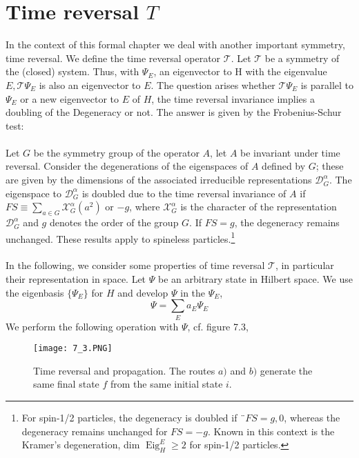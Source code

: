 \section{Time reversal $T$}
In the context of this formal chapter we deal with another important symmetry, time reversal. We define the time reversal operator $\mathcal{T}$. Let $\mathcal{T}$ be a symmetry of the (closed) system. Thus, with $\Psi_E$, an eigenvector to H with the eigenvalue $E, \mathcal{T} \Psi_E$ is also an eigenvector to $E$. The question arises whether $\mathcal{T}\Psi_E$ is parallel to $\Psi_E$ or a new eigenvector to $E$ of $H$, the time reversal invariance implies a doubling of the Degeneracy or not. The answer is given by the Frobenius-Schur test:
\\\\
Let $G$ be the symmetry group of the operator $A$, let $A$ be invariant under time reversal. Consider the degenerations of the eigenspaces of $A$ defined by $G$; these are given by the dimensions of the associated irreducible representations $\mathcal{D}^{\alpha}_G$. The eigenspace to $\mathcal{D}^{\alpha}_G$ is doubled due to the time reversal invariance of $A$ if $FS\equiv\sum_{a\in G}\mathcal{X}^{\alpha}_G(a^2)$ or $-g$, where $\mathcal{X}^{\alpha}_G$ is the character of the representation $\mathcal{D}^{\alpha}_G$ and $g$ denotes the order of the group $G$. If $F S = g$, the degeneracy remains unchanged. These results apply to spineless particles.\footnote{For spin-1/2 particles, the degeneracy is doubled if ¨$F S = g, 0$, whereas the degeneracy remains unchanged for $F S = -g$. Known in this context is the Kramer's degeneration, dim $\operatorname{Eig}^E_H \geq 2$ for spin-1/2 particles.}
\\\\
In the following, we consider some properties of time reversal $\mathcal{T}$, in particular their representation in space. Let $\Psi$ be an arbitrary state in Hilbert space. We use the eigenbasis $\{\Psi_E\}$ for $H$ and develop $\Psi$ in the $\Psi_E$,
\begin{equation}
    \Psi=\sum_{E} a_{E} \Psi_{E}
    \end{equation}
We perform the following operation with $\Psi$, cf. figure 7.3,
\begin{figure}[ht]
    \begin{minipage}{0.6\textwidth}
        \centering
        \texttt{[image: 7\_3.PNG]}
    \end{minipage}
    \begin{minipage}{0.4\textwidth}
        \caption{Time reversal and propagation. The routes $a)$ and $b)$ generate the same final state $f$ from the same initial state $i$.}
    \end{minipage}
\end{figure}

